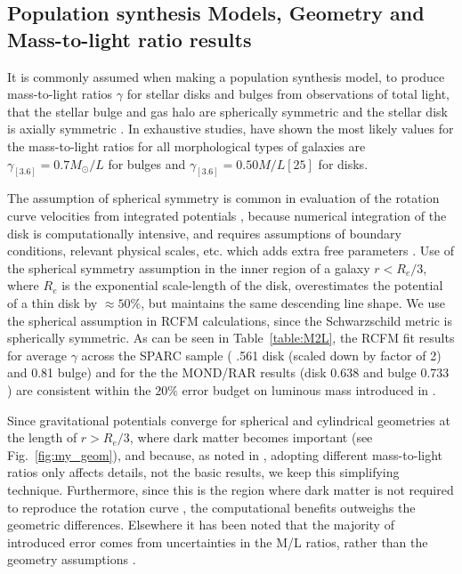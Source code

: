 \documentclass[reprint,%
 amsmath,amssymb,
 aps,
]{revtex4-1}
\begin{document}
 
\subsection{Population synthesis Models, Geometry  and  Mass-to-light ratio results}

 
  
    It is commonly assumed when making a population synthesis model, to produce  mass-to-light ratios $\gamma$ for  stellar disks and  bulges from observations of total light,  that   the stellar bulge and gas halo  are spherically symmetric and   the stellar disk is axially symmetric \cite{1954AJ.....59..273S}.
    In exhaustive studies,    \citet{McGaugh2016RAR} have shown the most likely values for the mass-to-light ratios for all morphological types of galaxies are 
    $\gamma_{[3.6]} = 0.7 M_\odot/L$ for bulges  and $\gamma_{[3.6]}= 0.50 M/L [25]$ for disks. 


    
 The assumption of spherical symmetry is common  in evaluation of the   rotation curve velocities from integrated potentials \cite{2022A&A...664A..40M,PhysRevD.70.083509}, because numerical integration of the disk is  computationally intensive, and requires assumptions of  boundary conditions,   relevant physical scales,  etc. which adds extra free parameters \cite{2011A&A...531A..36H}.
Use of the spherical  symmetry assumption
    in the inner region of a galaxy $r< R_e/3$, where $R_e$ is the exponential scale-length of the disk,  overestimates the potential of a thin disk by $\approx 50\%$,  but maintains the same descending line shape\cite{Chatterjee}. We use the spherical assumption in RCFM calculations, since  the 
 Schwarzschild metric is spherically symmetric.     As can be seen in Table~\ref{table:M2L}, the RCFM fit results for average $\gamma$ across the SPARC sample   ( .561 disk (scaled down by factor of 2)  and 0.81 bulge) and for the  
the MOND/RAR results (disk 0.638 and bulge 0.733 ) are consistent within the $20\%$ error budget on luminous mass introduced in \cite{2016Lelli}.   
    
    
    
    
    Since  gravitational potentials converge for spherical and cylindrical geometries at the length of $r>R_e/3$,  where dark matter becomes important (see Fig.~\ref{fig:my_geom}), and because,   as noted in   \cite{McGaugh2016RAR},   
        adopting different mass-to-light ratios only
affects details, not the basic results, we keep this simplifying technique.    Furthermore, since  this is the region where dark matter is not required to reproduce the rotation curve \cite{1985ApJAlbada},   the computational benefits   outweighs the geometric differences.  
 Elsewhere it has been noted that the majority of introduced  error comes from uncertainties in the M/L ratios, rather than the geometry assumptions \cite{2016Lelli}. 
 
\end{document}
